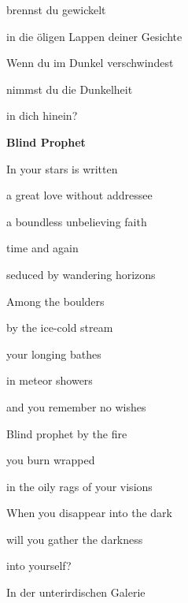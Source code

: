 \documentclass[a4paper]{article}
\begin{document}
brennst du gewickelt

in die öligen Lappen deiner Gesichte


\bigskip

Wenn du im Dunkel verschwindest

nimmst du die Dunkelheit 

in dich hinein?


\bigskip


\bigskip


\bigskip


\bigskip


\bigskip


\bigskip


\bigskip


\bigskip


\bigskip


\bigskip


\bigskip

{\bfseries
Blind Prophet}


\bigskip


\bigskip

In your stars is written

a great love without addressee

a boundless unbelieving faith

time and again 

seduced by wandering horizons


\bigskip

Among the boulders

by the ice-cold stream

your longing bathes 

in meteor showers

and you remember no wishes


\bigskip

Blind prophet by the fire

you burn wrapped 

in the oily rags of your visions


\bigskip

When you disappear into the dark

will you gather the darkness 

into yourself?


\bigskip



\bigskip


\bigskip

In der unterirdischen Galerie 
\end{document}
